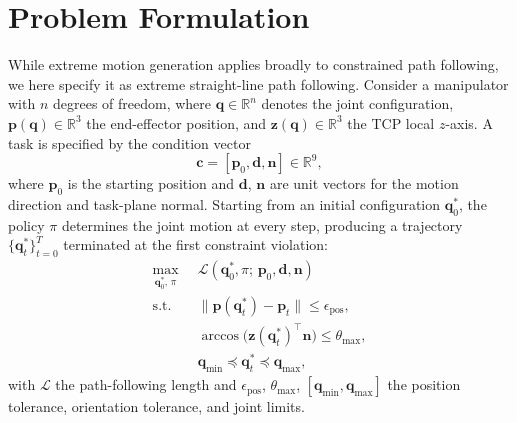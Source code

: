 \documentclass[journal]{IEEEtran}
\begin{document}
\section{Problem Formulation}
\label{sec:problem}
While extreme motion generation applies broadly to constrained path
following, we here specify it as extreme straight-line path following.
Consider a manipulator with $n$ degrees of freedom, where
$\mathbf{q}\in\mathbb{R}^{n}$ denotes the joint configuration,
$\mathbf{p}(\mathbf{q})\in\mathbb{R}^{3}$ the end-effector position, and
$\mathbf{z}(\mathbf{q})\in\mathbb{R}^{3}$ the TCP local $z$-axis. A task
is specified by the condition vector
\begin{equation}
\mathbf{c}=[\mathbf{p}_{0},\mathbf{d},\mathbf{n}]\in\mathbb{R}^{9},
\end{equation}
where $\mathbf{p}_{0}$ is the starting position and $\mathbf{d}$,
$\mathbf{n}$ are unit vectors for the motion direction and task-plane
normal. Starting from an initial configuration $\mathbf{q}^{*}_{0}$, the
policy $\pi$ determines the joint motion at every step, producing a
trajectory $\{\mathbf{q}^{*}_{t}\}_{t=0}^{T}$ terminated at the first
constraint violation:
\begin{align}
\max_{\mathbf{q}^{*}_{0},\,\pi}\;\;
&\mathcal{L}(\mathbf{q}^{*}_{0},\pi;\,
\mathbf{p}_{0},\mathbf{d},\mathbf{n})\label{eq:objective}\\
\text{s.t.}\;\;
&\|\mathbf{p}(\mathbf{q}^{*}_{t})-\mathbf{p}_{t}\|\leq
\epsilon_{\mathrm{pos}},\\
&\arccos\!\big(\mathbf{z}(\mathbf{q}^{*}_{t})^{\!\top}\mathbf{n}\big)
\leq\theta_{\max},\\
&\mathbf{q}_{\min}\preceq\mathbf{q}^{*}_{t}\preceq\mathbf{q}_{\max},
\end{align}
with $\mathcal{L}$ the path-following length and
$\epsilon_{\mathrm{pos}}$, $\theta_{\max}$,
$[\mathbf{q}_{\min},\mathbf{q}_{\max}]$ the position tolerance,
orientation tolerance, and joint limits.
\end{document}
